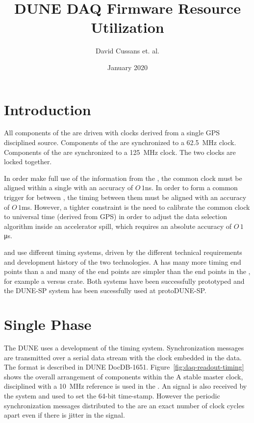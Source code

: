 \documentclass{article}
\title{DUNE DAQ Firmware Resource Utilization}
\author{David Cussans et. al. }
\date{January 2020}
\begin{document}
\maketitle

\section{Introduction}


All components of the  are driven with clocks derived from a single GPS disciplined source. Components of the  are
synchronized to a \SI{62.5}{\MHz} clock. Components of the  are synchronized to a \SI{125}{\MHz} clock. The two clocks are locked together.

In order make full use of the
information from the , the common clock must be
aligned within a single  with an accuracy of $O\,1$\si{ns}.
In order to form a common trigger for  between
, the timing between them must be aligned with an
accuracy of $O\,1$\si{ms}.  However, a tighter constraint is the need to
calibrate the common clock to universal time (derived from GPS) in
order to adjust the data selection algorithm inside an accelerator
spill, which requires an absolute accuracy of $O\,1$\si{\micro\s}.

\single and \dual {} use different timing systems,
driven by the different technical requirements and development history
of the two technologies. %
A  has many more
timing end points than a  and many of the end points
are simpler than the end points in the \dual{}, for example a 
versus  crate. Both systems have been successfully prototyped and the DUNE-SP system has been sucessfully used at protoDUNE-SP.

\section{Single Phase}

The DUNE  uses a development of the  timing system. 
Synchronization messages are transmitted over a serial
data stream with the clock embedded in the data. The format is
described in 
DUNE DocDB-1651. 
Figure~\ref{fig:daq-readout-timing}
shows the overall arrangement of components within the 
A stable master clock, disciplined with a \SI{10}{\MHz}
reference is used in the . An  signal is
also received by the system and used to set the  64-bit time-stamp. However the periodic synchronization
messages distributed to the   are an exact number
of clock cycles apart even if there is jitter in the  signal.
\end{document}
